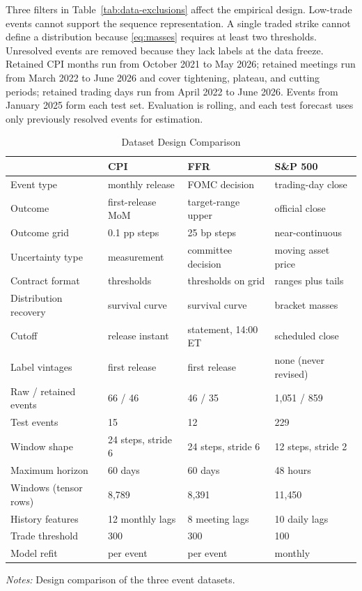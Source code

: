 \documentclass[12pt,a4paper]{report}
\newcommand{\tablenote}[1]{%
  \par\vspace{0.4em}%
  \begin{minipage}{0.9\textwidth}%
  \footnotesize\raggedright\emph{Notes:} #1%
  \end{minipage}%
}
\begin{document}
Three filters in Table~\ref{tab:data-exclusions} affect the empirical design.
Low-trade events cannot support the sequence representation. A single traded
strike cannot define a distribution because \eqref{eq:masses} requires at
least two thresholds. Unresolved events are removed because they lack labels
at the data freeze. Retained CPI months run from October 2021 to May 2026;
retained meetings run from March 2022 to June 2026 and cover tightening,
plateau, and cutting periods; retained trading days run from April 2022 to June
2026. Events from January 2025 form each test set. Evaluation is rolling, and
each test forecast uses only previously resolved events for estimation.

\begin{table}[htbp]
\centering
\caption{Dataset Design Comparison}
\label{tab:data-comparison}
\small
\begin{tabular}{@{}p{3.5cm}lll@{}}
\toprule
 & CPI & FFR & S\&P 500 \\
\midrule
Event type & monthly release & FOMC decision & trading-day close \\
Outcome & first-release MoM & target-range upper & official close \\
Outcome grid & 0.1 pp steps & 25 bp steps & near-continuous \\
Uncertainty type & measurement & committee decision & moving asset price \\
Contract format & thresholds & thresholds on grid & ranges plus tails \\
Distribution recovery & survival curve & survival curve & bracket masses \\
Cutoff & release instant & statement, 14:00 ET & scheduled close \\
Label vintages & first release & first release & none (never revised) \\
Raw / retained events & 66 / 46 & 46 / 35 & 1{,}051 / 859 \\
Test events & 15 & 12 & 229 \\
Window shape & 24 steps, stride 6 & 24 steps, stride 6 & 12 steps, stride 2 \\
Maximum horizon & 60 days & 60 days & 48 hours \\
Windows (tensor rows) & 8{,}789 & 8{,}391 & 11{,}450 \\
History features & 12 monthly lags & 8 meeting lags & 10 daily lags \\
Trade threshold & 300 & 300 & 100 \\
Model refit & per event & per event & monthly \\
\bottomrule
\end{tabular}
\tablenote{Design comparison of the three event datasets.}
\end{table}
\end{document}
